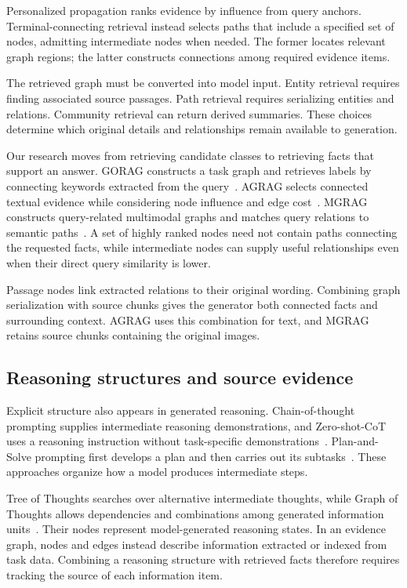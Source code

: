 Personalized propagation ranks evidence by influence from query anchors. Terminal-connecting retrieval instead selects paths that include a specified set of nodes, admitting intermediate nodes when needed. The former locates relevant graph regions; the latter constructs connections among required evidence items.

The retrieved graph must be converted into model input. Entity retrieval requires finding associated source passages. Path retrieval requires serializing entities and relations. Community retrieval can return derived summaries. These choices determine which original details and relationships remain available to generation.

Our research moves from retrieving candidate classes to retrieving facts that support an answer. GORAG constructs a task graph and retrieves labels by connecting keywords extracted from the query~\cite{bg-gorag}. AGRAG selects connected textual evidence while considering node influence and edge cost~\cite{bg-agrag}. MGRAG constructs query-related multimodal graphs and matches query relations to semantic paths~\cite{bg-mgrag}. A set of highly ranked nodes need not contain paths connecting the requested facts, while intermediate nodes can supply useful relationships even when their direct query similarity is lower.

Passage nodes link extracted relations to their original wording. Combining graph serialization with source chunks gives the generator both connected facts and surrounding context. AGRAG uses this combination for text, and MGRAG retains source chunks containing the original images.

\subsection{Reasoning structures and source evidence}

Explicit structure also appears in generated reasoning. Chain-of-thought prompting supplies intermediate reasoning demonstrations, and Zero-shot-CoT uses a reasoning instruction without task-specific demonstrations~\cite{lit-wei2022chain,lit-kojima2022large}. Plan-and-Solve prompting first develops a plan and then carries out its subtasks~\cite{lit-wang2023plan}. These approaches organize how a model produces intermediate steps.

Tree of Thoughts searches over alternative intermediate thoughts, while Graph of Thoughts allows dependencies and combinations among generated information units~\cite{lit-yao2024tree,lit-besta2024graph}. Their nodes represent model-generated reasoning states. In an evidence graph, nodes and edges instead describe information extracted or indexed from task data. Combining a reasoning structure with retrieved facts therefore requires tracking the source of each information item.


